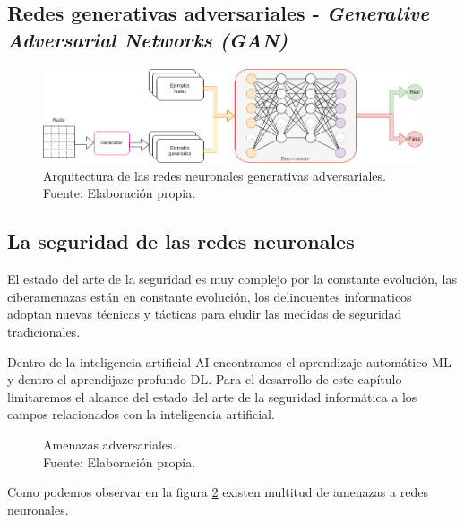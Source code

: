 \subsection{Redes generativas adversariales - \textit{Generative Adversarial Networks (GAN)}}
\begin{figure}[H]
    \centering
    \includegraphics[width=1\textwidth]{figures/chapter02/GANs.drawio.png}
    \caption{Arquitectura de las redes neuronales generativas adversariales.\\Fuente: Elaboración propia.}
    \label{fig:gans-architecture}
\end{figure}



\subsection{La seguridad de las redes neuronales}
\label{ch:2:section:state-of-the-art:computer-security-in-neural-networks}

El estado del arte de la seguridad es muy complejo por la constante evolución, las ciberamenazas están en constante evolución, los delincuentes informaticos adoptan nuevas técnicas y tácticas para eludir las medidas de seguridad tradicionales.

Dentro de la inteligencia artificial \gls{AI} encontramos el aprendizaje automático \gls{ML} y dentro el aprendijaze profundo \gls{DL}.
Para el desarrollo de este capítulo limitaremos el alcance del estado del arte de la seguridad informática a los campos relacionados con la inteligencia artificial.

\begin{figure}[H]
    \centering
    \centerline{}
    \caption{Amenazas adversariales.\\Fuente: Elaboración propia.}
    \label{fig:art-adversarial-threats}
\end{figure}

Como podemos observar en la figura \ref{fig:art-adversarial-threats} existen multitud de amenazas a redes neuronales.

